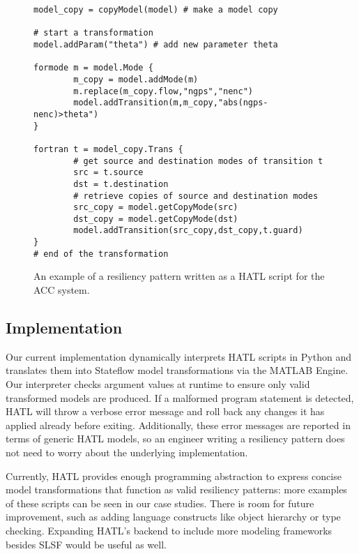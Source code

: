 %
\begin{figure}[!t]%
\begin{lstlisting}[basicstyle=\ttfamily\footnotesize, numbers=none]
model_copy = copyModel(model) # make a model copy

# start a transformation
model.addParam("theta") # add new parameter theta

formode m = model.Mode {
		m_copy = model.addMode(m)
		m.replace(m_copy.flow,"ngps","nenc")
		model.addTransition(m,m_copy,"abs(ngps-nenc)>theta")
}

fortran t = model_copy.Trans {
		# get source and destination modes of transition t
		src = t.source
		dst = t.destination
		# retrieve copies of source and destination modes
		src_copy = model.getCopyMode(src)
		dst_copy = model.getCopyMode(dst)
		model.addTransition(src_copy,dst_copy,t.guard)
}
# end of the transformation
\end{lstlisting}
\caption{An example of a resiliency pattern written as a HATL script for the ACC system.}%
%
\end{figure}

\subsection{Implementation}

Our current implementation dynamically interprets HATL scripts in
Python and translates them into Stateflow model transformations via
the MATLAB Engine. Our interpreter checks argument values at runtime
to ensure only valid transformed models are produced. If a malformed
program statement is detected, HATL will throw a verbose error message
and roll back any changes it has applied already before
exiting. Additionally, these error messages are reported in terms of
generic HATL models, so an engineer writing a resiliency pattern does
not need to worry about the underlying implementation.

Currently, HATL provides enough programming abstraction to express
concise model transformations that function as valid resiliency
patterns: more examples of these scripts can be seen in our case
studies. There is room for future improvement, such as adding language
constructs like object hierarchy or type checking. Expanding HATL's
backend to include more modeling frameworks besides SLSF would be
useful as well.












